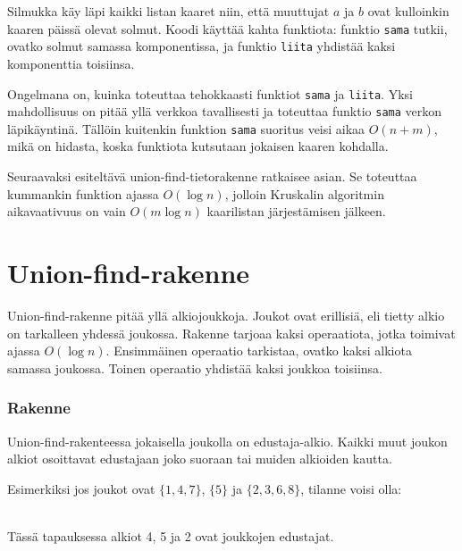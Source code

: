 Silmukka käy läpi kaikki listan kaaret
niin, että muuttujat $a$ ja $b$ ovat kulloinkin kaaren
päissä olevat solmut.
Koodi käyttää kahta funktiota:
funktio \texttt{sama} tutkii,
ovatko solmut samassa komponentissa,
ja funktio \texttt{liita}
yhdistää kaksi komponenttia toisiinsa.

Ongelmana on, kuinka toteuttaa tehokkaasti
funktiot \texttt{sama} ja \texttt{liita}.
Yksi mahdollisuus on pitää yllä verkkoa tavallisesti
ja toteuttaa funktio \texttt{sama} verkon läpikäyntinä.
Tällöin kuitenkin funktion \texttt{sama}
suoritus veisi aikaa $O(n+m)$,
mikä on hidasta, koska funktiota kutsutaan
jokaisen kaaren kohdalla.

Seuraavaksi esiteltävä union-find-tietorakenne
ratkaisee asian.
Se toteuttaa kummankin funktion
ajassa $O(\log n)$,
jolloin Kruskalin algoritmin
aikavaativuus on vain $O(m \log n)$
kaarilistan järjestämisen jälkeen.

\section{Union-find-rakenne}


Union-find-rakenne pitää yllä
alkiojoukkoja.
Joukot ovat erillisiä,
eli tietty alkio on tarkalleen
yhdessä joukossa.
Rakenne tarjoaa kaksi operaatiota,
jotka toimivat ajassa $O(\log n)$.
Ensimmäinen operaatio tarkistaa,
ovatko kaksi alkiota samassa joukossa.
Toinen operaatio yhdistää kaksi
joukkoa toisiinsa.

\subsubsection{Rakenne}

Union-find-rakenteessa jokaisella
joukolla on edustaja-alkio.
Kaikki muut joukon alkiot osoittavat
edustajaan joko suoraan tai
muiden alkioiden kautta.

Esimerkiksi jos joukot ovat
$\{1,4,7\}$, $\{5\}$ ja $\{2,3,6,8\}$,
tilanne voisi olla:
\\
\begin{center}
\end{center}
~\\
Tässä tapauksessa alkiot 4, 5 ja 2
ovat joukkojen edustajat.


